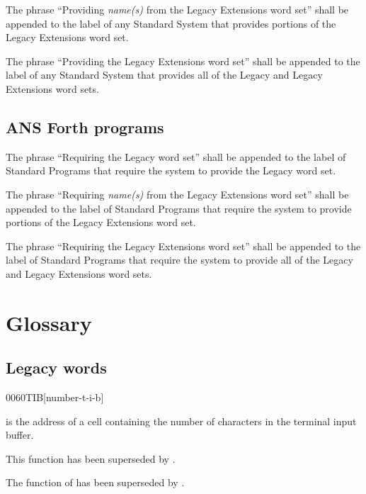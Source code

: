 The phrase ``Providing \emph{name(s)} from the Legacy Extensions
word set'' shall be appended to the label of any Standard System
that provides portions of the Legacy Extensions word set.

The phrase ``Providing the Legacy Extensions word set'' shall be
appended to the label of any Standard System that provides all of
the Legacy and Legacy Extensions word sets.

\cbstart{}
\subsection[Forth programs]{ANS Forth programs} %
\cbend

The phrase ``Requiring the Legacy word set'' shall be appended to
the label of Standard Programs that require the system to provide
the Legacy word set.

The phrase ``Requiring \emph{name(s)} from the Legacy Extensions
word set'' shall be appended to the label of Standard Programs that
require the system to provide portions of the Legacy Extensions
word set.

The phrase ``Requiring the Legacy Extensions word set'' shall be
appended to the label of Standard Programs that require the system
to provide all of the Legacy and Legacy Extensions word sets.


\section{Glossary} %

\subsection{Legacy words} %


\begin{worddef}[numTIB]{0060}{\num{}TIB}[number-t-i-b]
\item {}

	 is the address of a cell containing the number
	of characters in the terminal input buffer.

\note
	This function has been superseded by .

	\begin{rationale} %
		The function of  has been superseded by
		.
	\end{rationale}
\end{worddef}


